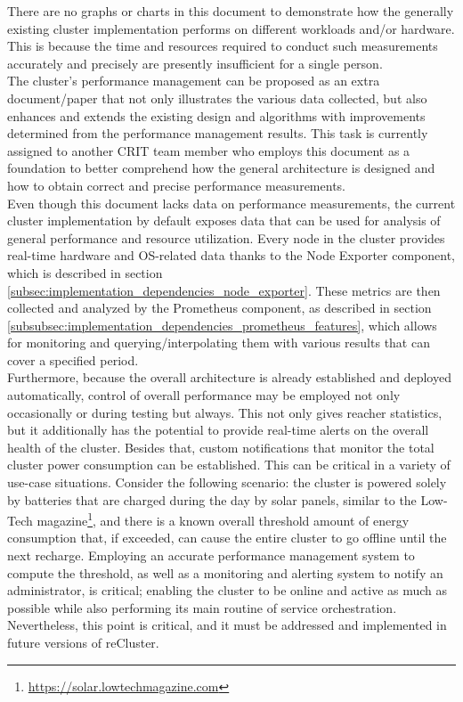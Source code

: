 There are no graphs or charts in this document to demonstrate how the generally existing
cluster implementation performs on different workloads and/or hardware. This is
because the time and resources required to conduct such measurements accurately
and precisely are presently insufficient for a single person. \\ %
The cluster's performance management can be proposed as an extra document/paper
that not only illustrates the various data collected, but also enhances and extends
the existing design and algorithms with improvements determined from the performance
management results. This task is currently assigned to another CRIT team member
who employs this document as a foundation to better comprehend how the general
architecture is designed and how to obtain correct and precise performance
measurements. \\ %
Even though this document lacks data on performance measurements, the current cluster
implementation by default exposes data that can be used for analysis of general performance
and resource utilization. Every node in the cluster provides real-time hardware
and OS-related data thanks to the Node Exporter component, which is described in
section \ref{subsec:implementation_dependencies_node_exporter}. These metrics
are then collected and analyzed by the Prometheus component, as described in section
\ref{subsubsec:implementation_dependencies_prometheus_features}, which allows
for monitoring and querying/interpolating them with various results that can
cover a specified period. \\ %
Furthermore, because the overall architecture is already established and deployed
automatically, control of overall performance may be employed not only
occasionally or during testing but always. This not only gives reacher statistics,
but it additionally has the potential to provide real-time alerts on the overall
health of the cluster. Besides that, custom notifications that monitor the total
cluster power consumption can be established. This can be critical in a variety of
use-case situations. Consider the following scenario: the cluster is powered solely
by batteries that are charged during the day by solar panels, similar to the Low-Tech
magazine\footnote{\url{https://solar.lowtechmagazine.com}}, and there is a known
overall threshold amount of energy consumption that, if exceeded, can cause the entire
cluster to go offline until the next recharge. Employing an accurate performance
management system to compute the threshold, as well as a monitoring and alerting
system to notify an administrator, is critical; enabling the cluster to be online
and active as much as possible while also performing its main routine of service
orchestration. \\ %
Nevertheless, this point is critical, and it must be addressed and implemented in
future versions of reCluster.

